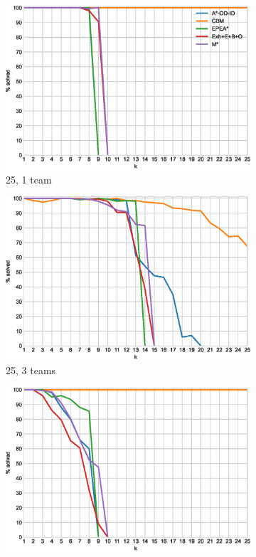 \documentclass[english,10pt]{article}
\begin{document}
	\begin{figure}[t]
	\centering
	\begin{subfigure}{0.44\textwidth}
		\centering
		\includegraphics[width=\linewidth]{img/results/relative-comparison/25-1-p}
		\caption{25, 1 team}
		\label{fig:25-1-p}
	\end{subfigure}
	\begin{subfigure}{0.44\textwidth}
		\centering
		\includegraphics[width=\linewidth]{img/results/relative-comparison/25-3-p}
		\caption{25, 3 teams}
		\label{fig:25-3-p}
	\end{subfigure}
	\begin{subfigure}{0.44\textwidth}
		\centering
		\includegraphics[width=\linewidth]{img/results/relative-comparison/75-1-p}

\end{subfigure}
\end{figure}
\end{document}
